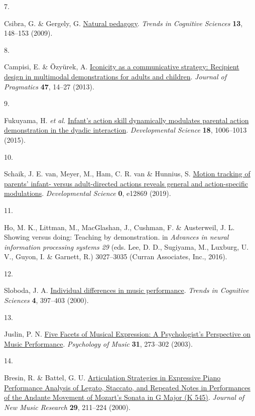 \documentclass[
  man,floatsintext]{apa6}
\newlength{\cslhangindent}
\newlength{\csllabelwidth}
\newlength{\cslentryspacingunit} %
\newenvironment{CSLReferences}[2] %
 {%
  \setlength{\parindent}{0pt}
  \ifodd #1
  \let\oldpar\par
  \def\par{\hangindent=\cslhangindent\oldpar}
  \fi
  \setlength{\parskip}{#2\cslentryspacingunit}
 }%
 {}
\newcommand{\CSLLeftMargin}[1]{\parbox[t]{\csllabelwidth}{#1}}
\newcommand{\CSLRightInline}[1]{\parbox[t]{\linewidth - \csllabelwidth}{#1}\break}
\begin{document}
\begin{CSLReferences}{0}{0}
\leavevmode{}%
\CSLLeftMargin{7. }%
\CSLRightInline{Csibra, G. \& Gergely, G. \href{https://doi.org/10.1016/j.tics.2009.01.005}{Natural pedagogy}. \emph{Trends in Cognitive Sciences} \textbf{13}, 148--153 (2009).}

\leavevmode{}%
\CSLLeftMargin{8. }%
\CSLRightInline{Campisi, E. \& Özyürek, A. \href{https://doi.org/10.1016/j.pragma.2012.12.007}{Iconicity as a communicative strategy: {Recipient} design in multimodal demonstrations for adults and children}. \emph{Journal of Pragmatics} \textbf{47}, 14--27 (2013).}

\leavevmode{}%
\CSLLeftMargin{9. }%
\CSLRightInline{Fukuyama, H. \emph{et al.} \href{https://doi.org/10.1111/desc.12270}{Infant's action skill dynamically modulates parental action demonstration in the dyadic interaction}. \emph{Developmental Science} \textbf{18}, 1006--1013 (2015).}

\leavevmode{}%
\CSLLeftMargin{10. }%
\CSLRightInline{Schaik, J. E. van, Meyer, M., Ham, C. R. van \& Hunnius, S. \href{https://doi.org/10.1111/desc.12869}{Motion tracking of parents' infant- versus adult-directed actions reveals general and action-specific modulations}. \emph{Developmental Science} \textbf{0}, e12869 (2019).}

\leavevmode{}%
\CSLLeftMargin{11. }%
\CSLRightInline{Ho, M. K., Littman, M., MacGlashan, J., Cushman, F. \& Austerweil, J. L. Showing versus doing: {Teaching} by demonstration. in \emph{Advances in neural information processing systems 29} (eds. Lee, D. D., Sugiyama, M., Luxburg, U. V., Guyon, I. \& Garnett, R.) 3027--3035 ({Curran Associates, Inc.}, 2016).}

\leavevmode{}%
\CSLLeftMargin{12. }%
\CSLRightInline{Sloboda, J. A. \href{https://doi.org/10.1016/S1364-6613(00)01531-X}{Individual differences in music performance}. \emph{Trends in Cognitive Sciences} \textbf{4}, 397--403 (2000).}

\leavevmode{}%
\CSLLeftMargin{13. }%
\CSLRightInline{Juslin, P. N. \href{https://doi.org/10.1177/03057356030313003}{Five {Facets} of {Musical Expression}: {A Psychologist}'s {Perspective} on {Music Performance}}. \emph{Psychology of Music} \textbf{31}, 273--302 (2003).}

\leavevmode{}%
\CSLLeftMargin{14. }%
\CSLRightInline{Bresin, R. \& Battel, G. U. \href{https://doi.org/10.1076/jnmr.29.3.211.3092}{Articulation {Strategies} in {Expressive Piano Performance Analysis} of {Legato}, {Staccato}, and {Repeated Notes} in {Performances} of the {Andante Movement} of {Mozart}'s {Sonata} in {G Major} ({K} 545)}. \emph{Journal of New Music Research} \textbf{29}, 211--224 (2000).}


\end{CSLReferences}
\end{document}

